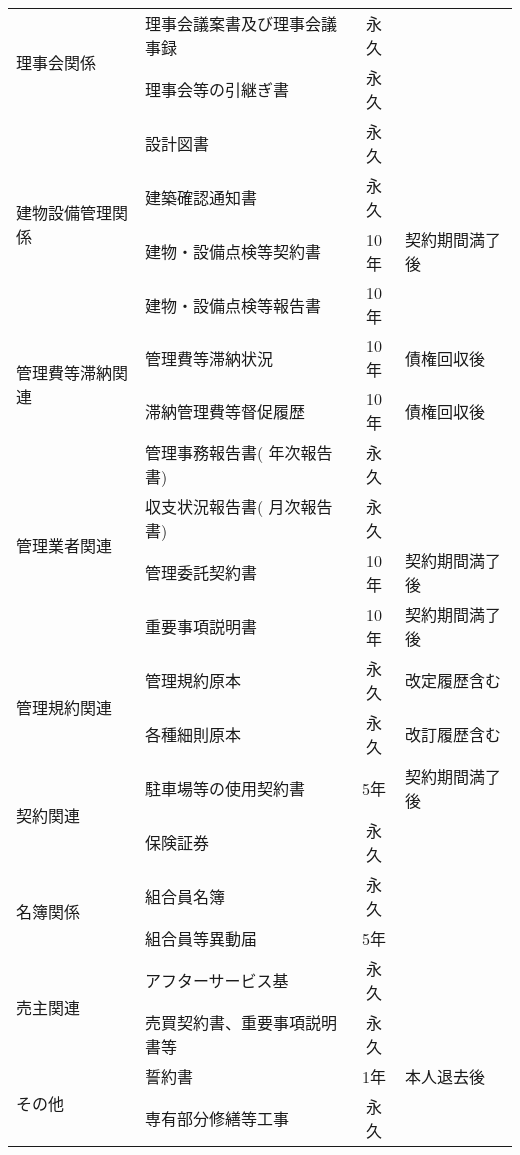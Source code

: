 \documentclass[12pt,uplatex]{jsarticle}
\begin{document}
\begin{table}[htbp]
{\begin{tabular}{|l|l|c|l|}
                                \hline
      \multirow{2}{*}{理事会関係} & 理事会議案書及び理事会議事録 & 永久 &  \\ \cline{2-4}
                                & 理事会等の引継ぎ書 & 永久 & \\ \cline{2-4}
                                \hline
      \multirow{4}{*}{建物設備管理関係} & 設計図書 & 永久 & \\ \cline{2-4}
                                & 建築確認通知書 & 永久 & \\ \cline{2-4}
                                & 建物・設備点検等契約書 & 10年 & 契約期間満了後 \\ \cline{2-4}
                                & 建物・設備点検等報告書 & 10年 & \\ \cline{2-4}
                                \hline
      \multirow{2}{*}{管理費等滞納関連} & 管理費等滞納状況 & 10年 &  債権回収後 \\ \cline{2-4}
                                & 滞納管理費等督促履歴 & 10年 & 債権回収後\\ \cline{2-4}
                                \hline
      \multirow{4}{*}{管理業者関連} & 管理事務報告書( 年次報告書) & 永久 & \\ \cline{2-4}
                                & 収支状況報告書( 月次報告書) & 永久 & \\ \cline{2-4}
                                & 管理委託契約書 & 10年 & 契約期間満了後 \\ \cline{2-4}
                                &  重要事項説明書 & 10年 & 契約期間満了後 \\ \cline{2-4}
                                \hline
      \multirow{2}{*}{管理規約関連} & 管理規約原本 & 永久 & 改定履歴含む \\ \cline{2-4}
                                & 各種細則原本 & 永久 & 改訂履歴含む \\ \cline{2-4}
                                \hline
      \multirow{2}{*}{契約関連} & 駐車場等の使用契約書 & 5年 & 契約期間満了後 \\ \cline{2-4}
                                &  保険証券 & 永久 &  \\ \cline{2-4}
                                \hline
      \multirow{2}{*}{名簿関係} & 組合員名簿 & 永久 &  \\ \cline{2-4}
                                &  組合員等異動届 & 5年 &  \\ \cline{2-4}
                                \hline
      \multirow{2}{*}{売主関連} & アフターサービス基 & 永久 &  \\ \cline{2-4}
                                & 売買契約書、重要事項説明書等 & 永久 &  \\ \cline{2-4}
                                \hline
      \multirow{2}{*}{その他} & 誓約書 & 1年 & 本人退去後 \\ \cline{2-4}
                                &  専有部分修繕等工事 & 永久 & \\ \cline{2-4}
                                \hline
    \end{tabular}
  }
\end{table}
\end{document}
